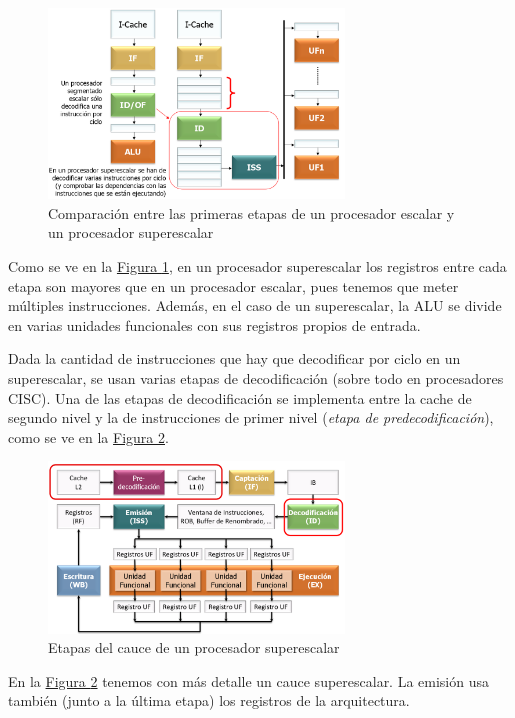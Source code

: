 \documentclass[10pt,a4paper,spanish]{report}
\begin{document}
\begin{figure}[!h]
\centering
\includegraphics[width=0.7\textwidth]{83}
\caption{Comparación entre las primeras etapas de un procesador escalar y un procesador superescalar}
\label{cmp_esc_sup}
\end{figure}
Como se ve en la \hyperref[cmp_esc_sup]{Figura \ref*{cmp_esc_sup}}, en un procesador superescalar los registros entre cada etapa son mayores que en un procesador escalar, pues tenemos que meter múltiples instrucciones. Además, en el caso de un superescalar, la ALU se divide en varias unidades funcionales con sus registros propios de entrada.

Dada la cantidad de instrucciones que hay que decodificar por ciclo en un superescalar, se usan varias etapas de decodificación (sobre todo en procesadores CISC). Una de las etapas de decodificación se implementa entre la cache de segundo nivel y la de instrucciones de primer nivel (\textit{\textcolor{azul}{etapa de predecodificación}}), como se ve en la \hyperref[cauce_super]{Figura \ref*{cauce_super}}.

\begin{figure}[!h]
\centering
\includegraphics[width=0.7\textwidth]{84}
\caption{Etapas del cauce de un procesador superescalar}
\label{cauce_super}
\end{figure}

En la \hyperref[cauce_super]{Figura \ref*{cauce_super}} tenemos  con más detalle un cauce superescalar. La emisión usa también (junto a la última etapa) los registros de la arquitectura.
\end{document}

